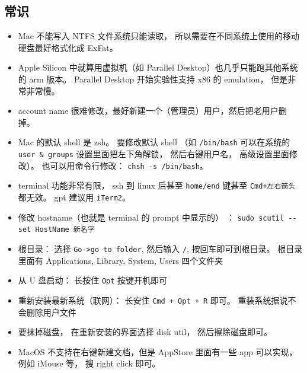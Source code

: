\subsection{常识}
\begin{itemize}
\item Mac 不能写入 NTFS 文件系统只能读取， 所以需要在不同系统上使用的移动硬盘最好格式化成 ExFat。
\item Apple Silicon 中就算用虚拟机（如 Parallel Desktop）也几乎只能跑其他系统的 arm 版本。 Parallel Desktop 开始实验性支持 x86 的 emulation， 但是非常非常慢。
\item account name 很难修改，最好新建一个（管理员）用户，然后把老用户删掉。
\item Mac 的默认 shell 是 zsh。 要修改默认 shell （如 \verb`/bin/bash` 可以在系统的 \verb`user & groups` 设置里面把左下角解锁， 然后右键用户名， 高级设置里面修改）。 也可以用命令行修改： \verb`chsh -s /bin/bash`。
\item terminal 功能非常有限， ssh 到 linux 后甚至 \verb`home/end` 键甚至 \verb`Cmd+左右箭头` 都无效。 gpt 建议用 \verb`iTerm2`。
\item 修改 hostname（也就是 terminal 的 prompt 中显示的） ： \verb`sudo scutil --set HostName 新名字`
\item 根目录： 选择 \verb`Go->go to folder`, 然后输入 \verb`/`, 按回车即可到根目录。 根目录里面有 Applications, Library, System, Users 四个文件夹
\item 从 U 盘启动： 长按住 \verb`Opt` 按键开机即可
\item 重新安装最新系统（联网）： 长安住 \verb`Cmd + Opt + R` 即可。 重装系统据说不会删除用户文件
\item 要抹掉磁盘， 在重新安装的界面选择 disk util， 然后擦除磁盘即可。
\item MacOS 不支持在右键新建文档，但是 AppStore 里面有一些 app 可以实现， 例如 iMouse 等， 搜 right click 即可。
\end{itemize}

